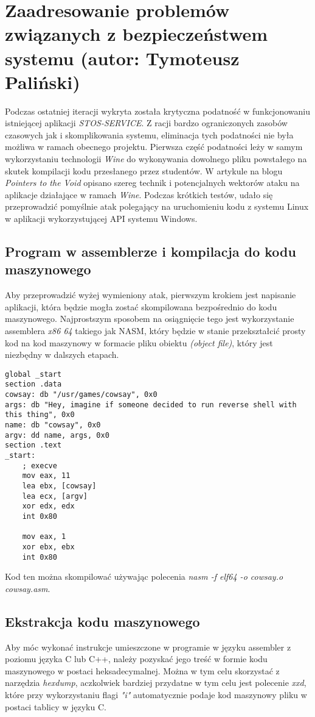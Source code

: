 
\section{Zaadresowanie problemów związanych z bezpieczeństwem systemu (autor: Tymoteusz Paliński)}
Podczas ostatniej iteracji wykryta została krytyczna podatność w funkcjonowaniu istniejącej aplikacji \textit{STOS-SERVICE}. Z racji bardzo ograniczonych zasobów czasowych jak i skomplikowania systemu, eliminacja tych podatności nie była możliwa w ramach obecnego projektu.
\newline \noindent Pierwsza część podatności leży w samym wykorzystaniu technologii \textit{Wine} do wykonywania dowolnego pliku powstałego na skutek kompilacji kodu przesłanego przez studentów. W artykule na blogu \textit{Pointers to the Void} \cite{wineHack} opisano szereg technik i potencjalnych wektorów ataku na aplikacje działające w ramach \textit{Wine}. Podczas krótkich testów, udało się przeprowadzić pomyślnie atak polegający na uruchomieniu kodu z systemu Linux w aplikacji wykorzystującej API systemu Windows.
\subsection{Program w assemblerze i kompilacja do kodu maszynowego}
Aby przeprowadzić wyżej wymieniony atak, pierwszym krokiem jest napisanie aplikacji, która będzie mogła zostać skompilowana bezpośrednio do kodu maszynowego. Najprostszym sposobem na osiągnięcie tego jest wykorzystanie assemblera \textit{x86 64} takiego jak NASM, który będzie w stanie przekształcić prosty kod na kod maszynowy w formacie pliku obiektu \textit{(object file)}, który jest niezbędny w dalszych etapach.
\lstset{style=asm}
\begin{lstlisting}[caption = {Przykładowy program napisany w assemblerze na system Linux wywołujący program Cowsay}]
global _start
section .data
cowsay: db "/usr/games/cowsay", 0x0
args: db "Hey, imagine if someone decided to run reverse shell with this thing", 0x0
name: db "cowsay", 0x0
argv: dd name, args, 0x0
section .text
_start:
	; execve
	mov eax, 11          
	lea ebx, [cowsay]   
	lea ecx, [argv]  
	xor edx, edx
	int 0x80

	mov eax, 1      
	xor ebx, ebx         
	int 0x80
\end{lstlisting}
Kod ten można skompilować używając polecenia \textit{nasm -f elf64 -o cowsay.o cowsay.asm}.
\subsection{Ekstrakcja kodu maszynowego}
Aby móc wykonać instrukcje umieszczone w programie w języku assembler z poziomu języka C lub C++, należy pozyskać jego treść w formie kodu maszynowego w postaci heksadecymalnej. Można w tym celu skorzystać z narzędzia \textit{hexdump}, aczkolwiek bardziej przydatne w tym celu jest polecenie \textit{xxd}, które przy wykorzystaniu flagi \textit{"i"} automatycznie podaje kod maszynowy pliku w postaci tablicy w języku C.
